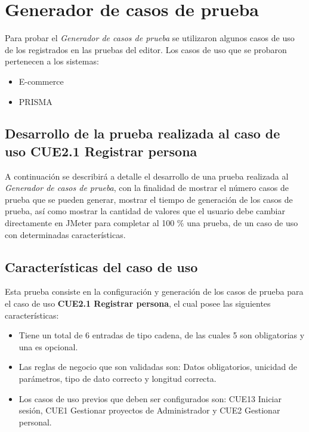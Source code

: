 \section{Generador de casos de prueba}

Para probar el {\it Generador de casos de prueba} se utilizaron algunos casos de uso de los registrados en las pruebas del editor. Los casos de uso que se probaron pertenecen a los sistemas:

\begin{itemize}
 \item E-commerce
 \item PRISMA
\end{itemize}

\subsection*{Desarrollo de la prueba realizada al caso de uso CUE2.1 Registrar persona}

A continuación se describirá a detalle el desarrollo de una prueba realizada al {\it Generador de casos de prueba}, con la finalidad de mostrar el número
casos de prueba que se pueden generar, mostrar el tiempo de generación de los casos de prueba, así como mostrar la cantidad de valores que el usuario debe cambiar 
directamente en JMeter para completar al 100 \% una prueba, de un caso de uso con determinadas características.\\

\subsection*{Características del caso de uso}
Esta prueba consiste en la configuración y 
generación de los casos de prueba para el caso de uso {\bf CUE2.1 Registrar persona}, el cual posee las siguientes características:

\begin{itemize}
 \item Tiene un total de 6 entradas de tipo cadena, de las cuales 5 son obligatorias y una es opcional.
 \item Las reglas de negocio que son validadas son: Datos obligatorios, unicidad de parámetros, tipo de dato correcto y longitud correcta.
 \item Los casos de uso previos que deben ser configurados son: CUE13 Iniciar sesión, CUE1 Gestionar proyectos de Administrador y CUE2 Gestionar personal.
\end{itemize}

